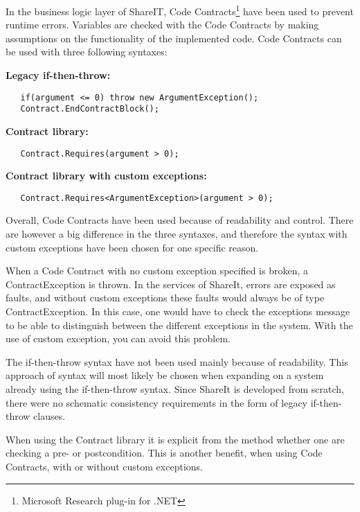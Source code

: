 \documentclass[../report.tex]{subfiles}
\begin{document}

In the business logic layer of ShareIT, Code Contracts\footnote{Microsoft Research plug-in for .NET} have been used to prevent runtime errors. Variables are checked with the Code Contracts by making assumptions on the functionality of the implemented code. Code Contracts can be used with three following syntaxes:

 \textbf{Legacy if-then-throw:}
\begin{lstlisting}
   if(argument <= 0) throw new ArgumentException();  
   Contract.EndContractBlock();
\end{lstlisting}

\textbf{Contract library:}
\begin{lstlisting}
   Contract.Requires(argument > 0);
\end{lstlisting}

\textbf{Contract library with custom exceptions:}
\begin{lstlisting}
   Contract.Requires<ArgumentException>(argument > 0);
\end{lstlisting}

Overall, Code Contracts have been used because of readability and control. There are however a big difference in the three syntaxes, and therefore the syntax with custom exceptions have been chosen for one specific reason. 

When a Code Contract with no custom exception specified is broken, a ContractException is thrown. In the services of ShareIt, errors are exposed as faults, and without custom exceptions these faults would always be of type ContractException. In this case, one would have to check the exceptions message to be able to distinguish between the different exceptions in the system. With the use of custom exception, you can avoid this problem. 

The if-then-throw syntax have not been used mainly because of readability. This approach of syntax will most likely be chosen when expanding on a system already using the if-then-throw syntax. Since ShareIt is developed from scratch, there were no schematic consistency requirements in the form of legacy if-then-throw clauses.

When using the Contract library it is explicit from the method whether one are checking a pre- or postcondition. This is another benefit, when using Code Contracts, with or without custom exceptions.
\end{document}
